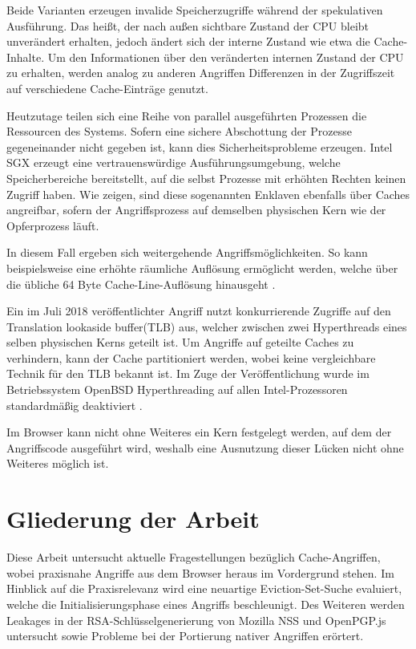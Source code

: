 Beide Varianten erzeugen invalide Speicherzugriffe während der spekulativen Ausführung. Das heißt, der nach außen sichtbare Zustand der CPU bleibt unverändert erhalten, jedoch ändert sich der interne Zustand wie etwa die Cache-Inhalte.
Um den Informationen über den veränderten internen Zustand der CPU zu erhalten, werden analog zu anderen Angriffen Differenzen in der Zugriffszeit auf verschiedene Cache-Einträge genutzt.

Heutzutage teilen sich eine Reihe von parallel ausgeführten Prozessen die Ressourcen des Systems.
Sofern eine sichere Abschottung der Prozesse gegeneinander nicht gegeben ist, kann dies Sicherheitsprobleme erzeugen.
Intel SGX erzeugt eine vertrauenswürdige Ausführungsumgebung, welche Speicherbereiche bereitstellt, auf die selbst Prozesse mit erhöhten Rechten keinen Zugriff haben.
Wie \cite{CacheZoom,CacheAttacksIntelSGX} zeigen, sind diese sogenannten Enklaven ebenfalls über Caches angreifbar, sofern der Angriffsprozess auf demselben physischen Kern wie der Opferprozess läuft.

In diesem Fall ergeben sich weitergehende Angriffsmöglichkeiten.
So kann beispielsweise eine erhöhte räumliche Auflösung ermöglicht werden, welche über die übliche 64 Byte Cache-Line-Auflösung hinausgeht \cite{MemJam}.

Ein im Juli 2018 veröffentlichter Angriff \cite{TLBleed} nutzt konkurrierende Zugriffe auf den Translation lookaside buffer(TLB) aus, welcher zwischen zwei Hyperthreads eines selben physischen Kerns geteilt ist.
Um Angriffe auf geteilte Caches zu verhindern, kann der Cache partitioniert werden, wobei keine vergleichbare Technik für den TLB bekannt ist.
Im Zuge der Veröffentlichung wurde im Betriebssystem OpenBSD Hyperthreading auf allen Intel-Prozessoren standardmäßig deaktiviert \cite{OpenBSDHyperthreading}.

Im Browser kann nicht ohne Weiteres ein Kern festgelegt werden, auf dem der Angriffscode ausgeführt wird, weshalb eine Ausnutzung dieser Lücken nicht ohne Weiteres möglich ist.

\section{Gliederung der Arbeit}

Diese Arbeit untersucht aktuelle Fragestellungen bezüglich Cache-Angriffen, wobei praxisnahe Angriffe aus dem Browser heraus im Vordergrund stehen.
Im Hinblick auf die Praxisrelevanz wird eine neuartige Eviction-Set-Suche evaluiert, welche die Initialisierungsphase eines Angriffs beschleunigt.
Des Weiteren werden Leakages in der RSA-Schlüsselgenerierung von Mozilla NSS und OpenPGP.js untersucht sowie Probleme bei der Portierung nativer Angriffen erörtert.


